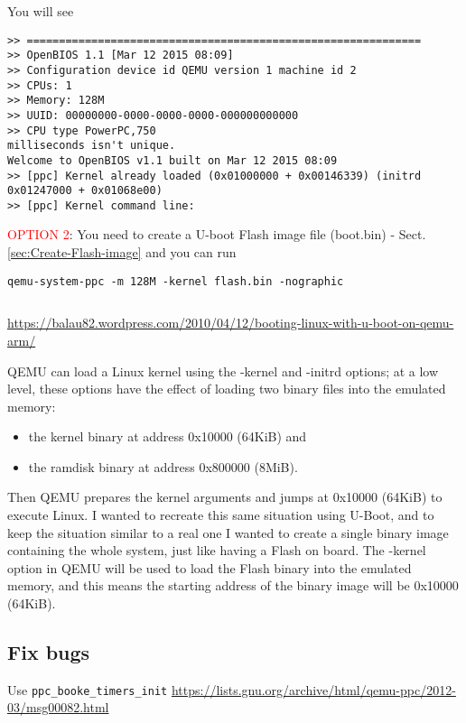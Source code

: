 You will see
\begin{verbatim}
>> =============================================================
>> OpenBIOS 1.1 [Mar 12 2015 08:09]
>> Configuration device id QEMU version 1 machine id 2
>> CPUs: 1
>> Memory: 128M
>> UUID: 00000000-0000-0000-0000-000000000000
>> CPU type PowerPC,750
milliseconds isn't unique.
Welcome to OpenBIOS v1.1 built on Mar 12 2015 08:09
>> [ppc] Kernel already loaded (0x01000000 + 0x00146339) (initrd 0x01247000 + 0x01068e00)
>> [ppc] Kernel command line: 

\end{verbatim}


\textcolor{red}{OPTION 2}: You need to create a U-boot Flash image file
(boot.bin) - Sect.\ref{sec:Create-Flash-image} and you can run
\begin{verbatim}
qemu-system-ppc -m 128M -kernel flash.bin -nographic
\end{verbatim}

\begin{verbatim}

\end{verbatim}
\url{https://balau82.wordpress.com/2010/04/12/booting-linux-with-u-boot-on-qemu-arm/}

QEMU can load a Linux kernel using the -kernel and -initrd options; at a low
level, these options have the effect of loading two binary files into the
emulated memory: 
\begin{itemize}
  \item the kernel binary at address 0x10000 (64KiB) and 
  
  \item the ramdisk binary at address 0x800000 (8MiB). 
\end{itemize}

Then QEMU prepares the kernel arguments and jumps at 0x10000 (64KiB) to execute
Linux. I wanted to recreate this same situation using U-Boot, and to keep the
situation similar to a real one I wanted to create a single binary image
containing the whole system, just like having a Flash on board. The -kernel
option in QEMU will be used to load the Flash binary into the emulated memory,
and this means the starting address of the binary image will be 0x10000 (64KiB).

\subsection{Fix bugs}

Use \verb!ppc_booke_timers_init!
\url{https://lists.gnu.org/archive/html/qemu-ppc/2012-03/msg00082.html}